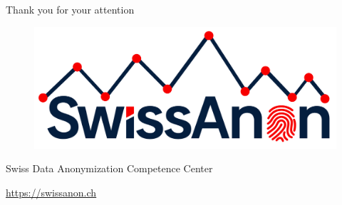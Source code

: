 \documentclass[
	11pt, %
]{beamer}
\begin{document}
\begin{frame}[plain]

\centering

\Huge Thank you for your attention\\

  \vspace{2em}

  \begin{figure}
      \centering
      \includegraphics[width=0.5\linewidth]{style/SwissAnon.png}
  \end{figure}

\large Swiss Data Anonymization Competence Center

\href{https://swissanon.ch}{\color{blue}\underline{https://swissanon.ch}}
\end{frame}

\end{document}
